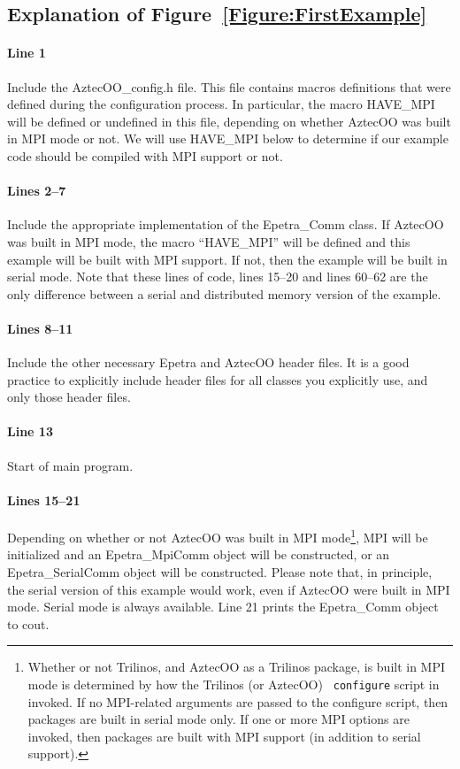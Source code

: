 \documentclass[12pt,relax]{AztecOOUserGuide}
\newcommand{\comm}{Epetra\_Comm}
\newcommand{\serialcomm}{Epetra\_SerialComm}
\newcommand{\mpicomm}{Epetra\_MpiComm}
\begin{document}
\subsection{Explanation of Figure~\ref{Figure:FirstExample}}

\paragraph{Line 1}
Include the AztecOO\_config.h file.  This file contains macros
definitions that were defined during the configuration process.  In
particular, the macro HAVE\_MPI will be defined or undefined in this
file, depending on whether AztecOO was built in MPI mode or not.  We
will use HAVE\_MPI below to determine if our example code should be
compiled with MPI support or not.
\paragraph{Lines 2--7}
Include the appropriate implementation of the \comm{} class.  If
AztecOO was built in MPI mode, the macro ``HAVE\_MPI'' will be defined
and this example will be built with MPI support.  If not, then the
example will be built in serial mode.  Note that these lines of code,
lines 15--20 and lines 60--62 are the only difference between a serial
and distributed memory version of the example.
\paragraph{Lines 8--11}
Include the other necessary Epetra and AztecOO header files.
It is a good practice to explicitly include header files for all
classes you explicitly use, and only those header files.
\paragraph{Line 13}
Start of main program.
\paragraph{Lines 15--21}
Depending on whether or not AztecOO was built in MPI
mode\footnote{Whether or not Trilinos, and AztecOO as a Trilinos package, is built
in MPI mode is determined by how the Trilinos (or AztecOO) {\tt
configure} script in invoked.  If no MPI-related arguments are passed
to the configure script, then packages are built in serial mode only.
If one or more MPI options are invoked, then packages are built with
MPI support (in addition to serial support).}, MPI will be initialized
and an \mpicomm{} object will be constructed, or an \serialcomm{}
object will be constructed.  Please note that, in principle, the serial
version of this example would work, even if AztecOO were built in MPI
mode.  Serial mode is always available.  Line 21 prints the \comm{}
object to cout.
\end{document}
